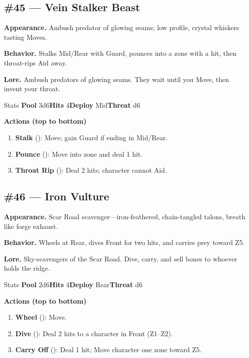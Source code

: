 \subsection*{\#45 --- Vein Stalker Beast}

\textbf{Appearance.} Ambush predator of glowing seams; low profile, crystal whiskers tasting Moves.

\textbf{Behavior.} Stalks Mid/Rear with Guard, pounces into a zone with a hit, then throat-rips Aid away.

\textbf{Lore.} Ambush predators of glowing seams. They wait until you Move, then invent your throat.

\begin{monsterentry}{Stats}
\textbf{Pool} 3d6\quad\textbf{Hits} 4\quad\textbf{Deploy} Mid\quad\textbf{Threat} d6

\textbf{Actions (top to bottom)}
\begin{enumerate}\setlength{\itemsep}{0.15em}\setlength{\parskip}{0pt}
  \item \textbf{Stalk} (\easy): Move; gain Guard if ending in Mid/Rear.
  \item \textbf{Pounce} (\medium): Move into zone and deal 1 hit.
  \item \textbf{Throat Rip} (\hard): Deal 2 hits; character cannot Aid.
\end{enumerate}
\end{monsterentry}

\subsection*{\#46 --- Iron Vulture}

\textbf{Appearance.} Scar Road scavenger---iron-feathered, chain-tangled talons, breath like forge exhaust.

\textbf{Behavior.} Wheels at Rear, dives Front for two hits, and carries prey toward Z5.

\textbf{Lore.} Sky-scavengers of the Scar Road. Dive, carry, and sell bones to whoever holds the ridge.

\begin{monsterentry}{Stats}
\textbf{Pool} 2d6\quad\textbf{Hits} 4\quad\textbf{Deploy} Rear\quad\textbf{Threat} d6

\textbf{Actions (top to bottom)}
\begin{enumerate}\setlength{\itemsep}{0.15em}\setlength{\parskip}{0pt}
  \item \textbf{Wheel} (\easy): Move.
  \item \textbf{Dive} (\medium): Deal 2 hits to a character in Front (Z1--Z2).
  \item \textbf{Carry Off} (\hard): Deal 1 hit; Move character one zone toward Z5.
\end{enumerate}
\end{monsterentry}


